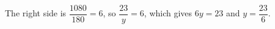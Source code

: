 The right side is $\dfrac{1080}{180}=6$, so $\dfrac{23}{y}=6$, which gives $6y=23$ and $y=\boxed{\dfrac{23}{6}}$.
